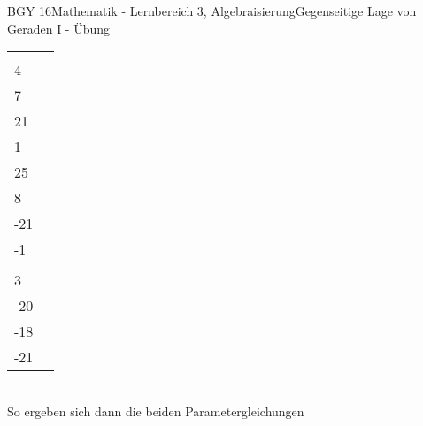 \documentclass[oneside,openany,headings=optiontotoc,11pt,numbers=noenddot]{scrreprt}
\begin{document}
\begin{worksheet}{BGY 16}{Mathematik - Lernbereich 3, Algebraisierung}{Gegenseitige Lage von Geraden I - Übung}
\begin{framed}
\begin{tabularx}{\textwidth}{X|X}
				\(\vec{p} = \vec{0A} = \left(\begin{matrix}2\\4\\7\end{matrix}\right), \vec{u_1} = \vec{AB} = \left(\begin{matrix}11\\21\\1\end{matrix}\right), \) & \(\vec{q} = \vec{0B} =  \left(\begin{matrix}13\\25\\8\end{matrix}\right), \vec{u_2} = \vec{BA} = \left(\begin{matrix}-11\\-21\\-1\end{matrix}\right), \)\\
				\(\vec{v_1} = \vec{AC} = \left(\begin{matrix}4\\3\\-20\end{matrix}\right)\) & \(\vec{v_2} = \vec{BC} = \left(\begin{matrix}-7\\-18\\-21\end{matrix}\right)\)\\
			\end{tabularx}\\
			So ergeben sich dann die beiden Parametergleichungen\\
			\par\noindent
			\begin{tabularx}{\textwidth}{X|X}

\end{tabularx}
\end{framed}
\end{worksheet}
\end{document}
